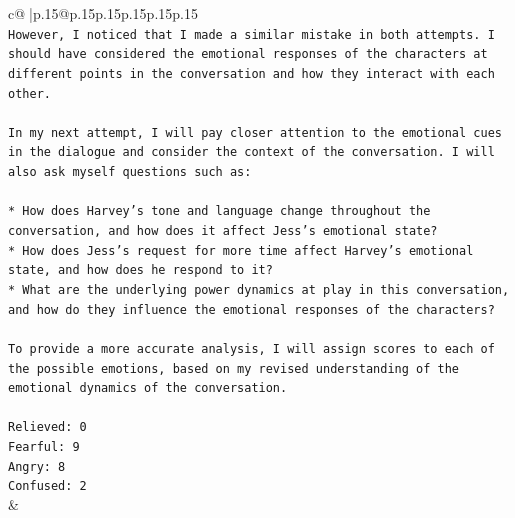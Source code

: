 \documentclass{article}
\begin{document}
{\begin{supertabular}{c@{$\;$}|p{.15\linewidth}@{}p{.15\linewidth}p{.15\linewidth}p{.15\linewidth}p{.15\linewidth}p{.15\linewidth}}
{{{\\ 
\texttt{However, I noticed that I made a similar mistake in both attempts. I should have considered the emotional responses of the characters at different points in the conversation and how they interact with each other. } \\
\\ 
\texttt{In my next attempt, I will pay closer attention to the emotional cues in the dialogue and consider the context of the conversation. I will also ask myself questions such as:} \\
\\ 
\texttt{* How does Harvey's tone and language change throughout the conversation, and how does it affect Jess's emotional state?} \\
\texttt{* How does Jess's request for more time affect Harvey's emotional state, and how does he respond to it?} \\
\texttt{* What are the underlying power dynamics at play in this conversation, and how do they influence the emotional responses of the characters?} \\
\\ 
\texttt{To provide a more accurate analysis, I will assign scores to each of the possible emotions, based on my revised understanding of the emotional dynamics of the conversation.} \\
\\ 
\texttt{Relieved: 0} \\
\texttt{Fearful: 9} \\
\texttt{Angry: 8} \\
\texttt{Confused: 2} \\
            }
        }
    }
    & \\ \\

\end{supertabular}
}
\end{document}

